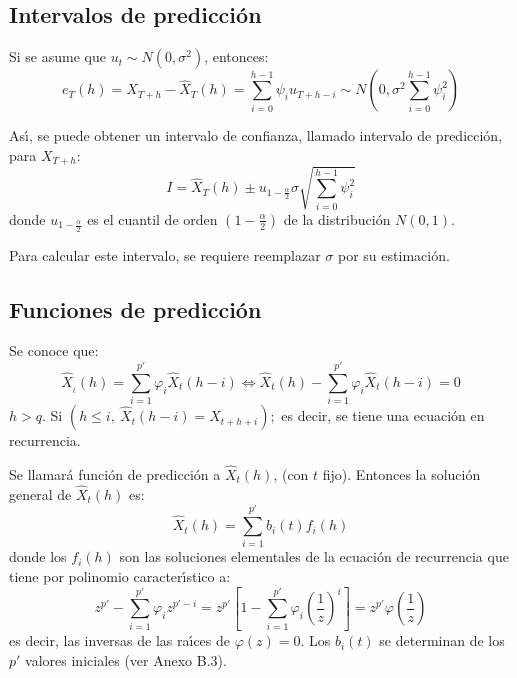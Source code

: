\subsection{Intervalos de predicci\'{o}n}

Si se asume que $u_{t} \sim N\left( {0,\sigma^{2}} \right)$, entonces:
\[
 e_{T} (h)=X_{T+h} -\widehat{X} _{T} (h)=\sum_{i=0}^{h-1} {\psi_{i} u_{T+h-i} }  \sim N\left({0,\sigma^{2}\sum_{i=0}^{h-1} {\psi_{i}^{2} } } \right)
\]

As\'{\i}, se puede obtener un intervalo de confianza, llamado intervalo de 
predicci\'{o}n, para $X_{T+h}$:
\[
I=\widehat{X} _{T} (h)\pm u_{1-\frac{\alpha }{2}} \sigma 
\sqrt {\sum_{i=0}^{h-1} {\psi_{i}^{2} } } 
\]
donde $u_{1-\frac{\alpha}{2}}$ es el  cuantil de orden $(1-\frac{\alpha}{2})$  de la distribuci\'{o}n $N(0,1)$.

Para calcular este intervalo, se requiere reemplazar $\sigma $ por su 
estimaci\'{o}n.

\subsection{Funciones de predicci\'{o}n}

Se conoce que:
\[
\widehat{X}_{_{t} } (h)=\sum_{i=1}^{p'} {\varphi_{i} 
\widehat{X}_{t} (h-i)} \Longleftrightarrow \widehat{X}_{t} (h)-\sum_{i=1}^{p'} {\varphi_{i} \widehat{X}_{t} 
(h-i)=0} 
\]
$h>q$. Si $\left(h\le i,\ \widehat{X}_{t} (h-i)=X_{t+h+i} \right);$ es decir, se tiene una ecuaci\'{o}n en recurrencia.

Se llamar\'{a} funci\'{o}n de predicci\'{o}n a $\widehat{X}_{t} (h)$, (con $t$ fijo). Entonces la soluci\'{o}n 
general de $\widehat{X} _{t} (h)$ es:
\[
\widehat{X} _{t} (h)=\sum_{i=1}^{p'} {b_{i} 
(t)f_{i} (h)} 
\]
donde los $f_{i}(h)$ son las soluciones elementales de la 
ecuaci\'{o}n de recurrencia que tiene por polinomio caracter\'{\i}stico a:
\[
z^{p'}-\sum_{i=1}^{p'} {\varphi_{i} z^{p'-i}} =z^{p'}\left[ 
{1-\sum_{i=1}^{p'} {\varphi_{i} } \left( {\frac{1}{z}} \right)^{i}} 
\right]=z^{p'}\varphi \left( {\frac{1}{z}} \right)
\]
es decir, las inversas de las ra\'{\i}ces de $\varphi \left( z \right)=0$. 
Los $b_{i}(t)$ se determinan de los $p'$ valores iniciales (ver 
Anexo B.3).

